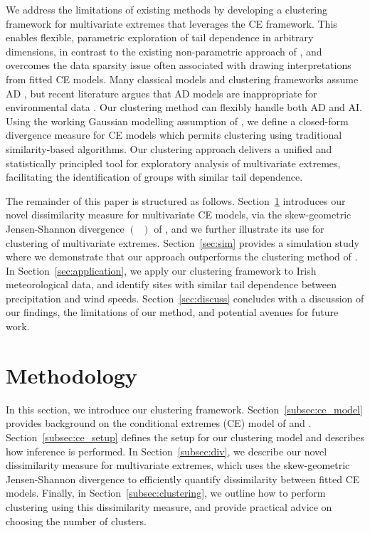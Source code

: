 \documentclass[12pt,compact]{article}
\newcommand{\JSGa}{\mathop{\mathrm{JS}^{\mathrm{G}_{\lambda}}}\nolimits}
\begin{document}
We address the limitations of existing methods by developing a clustering framework for multivariate extremes that leverages the CE framework. 
This enables flexible, parametric exploration of tail dependence in arbitrary dimensions, in contrast to the existing non-parametric approach of \citet{Vignotto2021}, and overcomes the data sparsity issue often associated with drawing interpretations from fitted CE models.
Many classical models and clustering frameworks assume AD \citep{Vignotto2021,Boulin2025}, but recent literature argues that AD models are inappropriate for environmental data \citep{Opitz2016,Dawkins2018,Huser2024}. 
Our clustering method can flexibly handle both AD and AI. 
Using the working Gaussian modelling assumption of \citet{Heffernan2004}, we define a closed-form divergence measure for CE models which permits clustering using traditional similarity-based algorithms. 
Our clustering approach delivers a unified and statistically principled tool for exploratory analysis of multivariate extremes, facilitating the identification of groups with similar tail dependence. 

The remainder of this paper is structured as follows.
Section~\ref{sec:method} introduces our novel dissimilarity measure for multivariate CE models, via the
skew-geometric Jensen-Shannon divergence $\left(\JSGa{}\right)$ of \citet{Nielsen2019}, and we further illustrate its use for clustering of multivariate extremes. 
Section~\ref{sec:sim} provides a simulation study where we demonstrate that our approach outperforms the clustering method of \citet{Vignotto2021}.
In Section~\ref{sec:application}, we apply our clustering framework to Irish meteorological data, and identify sites with similar tail dependence between precipitation and wind speeds.
Section~\ref{sec:discuss} concludes with a discussion of our findings, the limitations of our method, and potential avenues for future work. %

\section{Methodology}
\label{sec:method}

In this section, we introduce our clustering framework. 
Section~\ref{subsec:ce_model} provides background on the conditional extremes (CE) model of \citet{Heffernan2004} and \citet{Keef2013}.
Section~\ref{subsec:ce_setup} defines the setup for our clustering model and describes how inference is performed.
In Section~\ref{subsec:div}, we describe our novel dissimilarity measure for multivariate extremes, which uses the skew-geometric Jensen-Shannon divergence to efficiently quantify dissimilarity between fitted CE models.
Finally, in Section~\ref{subsec:clustering}, we outline how to perform clustering using this dissimilarity measure, and provide practical advice on choosing the number of clusters.
\end{document}
